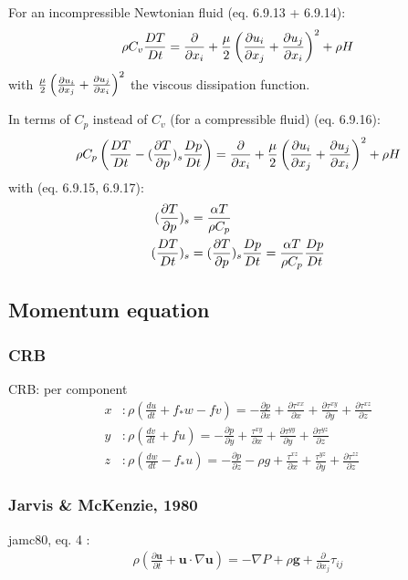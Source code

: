 \documentclass[document.tex]{subfiles}
\begin{document}
For an incompressible Newtonian fluid (eq. 6.9.13 + 6.9.14): 
\begin{equation}
    \rho C_v \frac{D T}{D t} = \pdv{}{x_i}(k\pdv{T}{x_i}) + \frac{\mu}{2}\left(\pdv{u_i}{x_j} + \pdv{u_j}{x_i}\right)^2+\rho H
\end{equation}
with $\frac{\mu}{2}\left(\pdv{u_i}{x_j} + \pdv{u_j}{x_i}\right)^2$ the viscous dissipation function. 

In terms of $C_p$ instead of $C_v$ (for a compressible fluid) (eq. 6.9.16): 
\begin{equation}
    \rho C_p \left(\frac{D T}{D t} - (\pdv{T}{p})_s \frac{D p}{D t}\right) = \pdv{}{x_i}(k\pdv{T}{x_i}) + \frac{\mu}{2}\left(\pdv{u_i}{x_j} + \pdv{u_j}{x_i}\right)^2+\rho H
\end{equation}
with (eq. 6.9.15, 6.9.17):
\begin{align*}
    (\pdv{T}{p})_s &= \frac{\alpha T}{\rho C_p} \\
    (\frac{D T}{D t})_s &= (\pdv{T}{p})_s \frac{D p}{D t} = \frac{\alpha T}{\rho C_p} \frac{D p}{D t}
\end{align*}

\subsection{Momentum equation}

\subsubsection{CRB}
CRB: \cite{cube11} per component 
\begin{subequations}
\begin{align}
x &: \rho	\left(\frac{du}{dt} + f_*w-fv\right) = -\frac{\partial p}{\partial x} + \frac{\partial \tau^{xx}}{\partial x} + \frac{\partial \tau^{xy}}{\partial y} + \frac{\partial \tau^{xz}}{\partial z}\\
y &: \rho\left(\frac{dv}{dt}+fu \right) = -\frac{\partial p}{\partial y} + \frac{\tau^{xy}}{\partial x} + \frac{\partial \tau ^{yy}}{\partial y} + \frac{\partial \tau^{yz}}{\partial z}\\
z &: \rho \left(\frac{dw}{dt} - f_*u\right) = -\frac{\partial p}{\partial z }-\rho g+ \frac{\tau^{xz}}{\partial x} + \frac{\tau^{yz}}{\partial y} + \frac{\partial \tau^{zz}}{\partial z}
\end{align}
\end{subequations}

\subsubsection{Jarvis \& McKenzie, 1980}
jamc80, eq. 4 \cite{jamc80}: 
\begin{align}
\rho	\left(\frac{\partial \textbf{u}}{\partial t} +\textbf{u} \cdot \nabla\textbf{u}\right) = -\nabla P + \rho	\textbf{g} + \frac{\partial}{\partial x_j}\tau_{ij}
\end{align}
\end{document}

